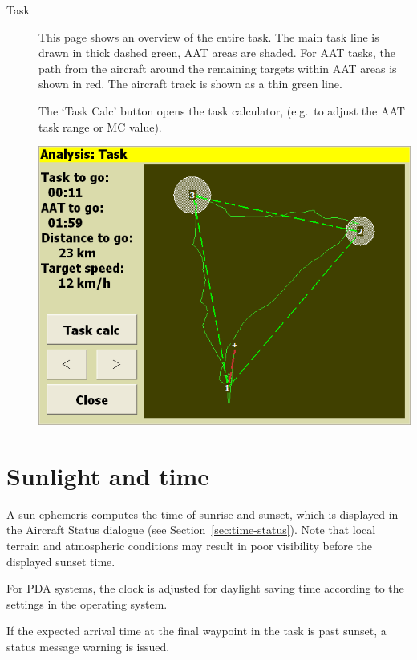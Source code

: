 \begin{description}
\item[Task]
  This page shows an overview of the entire task.  The main task line
  is drawn in thick dashed green, AAT areas are shaded.  For AAT
  tasks, the path from the aircraft around the remaining targets within AAT
  areas is shown in red.  The aircraft track is shown as a thin green line.

  The `Task Calc' button opens the task calculator,
  (e.g.\ to adjust the AAT task range or MC value).

\begin{center}
\includegraphics[angle=0,width=0.8\linewidth,keepaspectratio='true']{figures/analysis-task.png}
\end{center}

\end{description}

\section{Sunlight and time}

A sun ephemeris computes the time of sunrise and sunset, which is displayed in the
Aircraft Status dialogue (see Section~\ref{sec:time-status}).  Note that
local terrain and atmospheric conditions may result in poor visibility
before the displayed sunset time.

For PDA systems, the clock is adjusted for daylight saving time according
to the settings in the operating system.

If the expected arrival time at the final waypoint in the task is past
sunset, a status message warning is issued.
